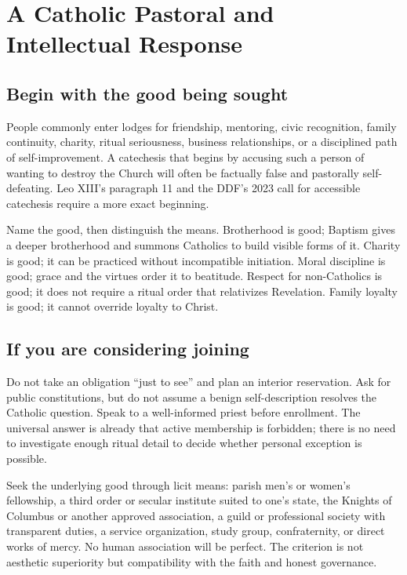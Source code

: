 \section{A Catholic Pastoral and Intellectual Response}

\subsection{Begin with the good being sought}

People commonly enter lodges for friendship, mentoring, civic recognition, family continuity, charity, ritual seriousness, business relationships, or a disciplined path of self-improvement. A catechesis that begins by accusing such a person of wanting to destroy the Church will often be factually false and pastorally self-defeating. Leo XIII's paragraph 11 and the DDF's 2023 call for accessible catechesis require a more exact beginning.

Name the good, then distinguish the means. Brotherhood is good; Baptism gives a deeper brotherhood and summons Catholics to build visible forms of it. Charity is good; it can be practiced without incompatible initiation. Moral discipline is good; grace and the virtues order it to beatitude. Respect for non-Catholics is good; it does not require a ritual order that relativizes Revelation. Family loyalty is good; it cannot override loyalty to Christ.

\subsection{If you are considering joining}

Do not take an obligation “just to see” and plan an interior reservation. Ask for public constitutions, but do not assume a benign self-description resolves the Catholic question. Speak to a well-informed priest before enrollment. The universal answer is already that active membership is forbidden; there is no need to investigate enough ritual detail to decide whether personal exception is possible.

Seek the underlying good through licit means: parish men's or women's fellowship, a third order or secular institute suited to one's state, the Knights of Columbus or another approved association, a guild or professional society with transparent duties, a service organization, study group, confraternity, or direct works of mercy. No human association will be perfect. The criterion is not aesthetic superiority but compatibility with the faith and honest governance.

